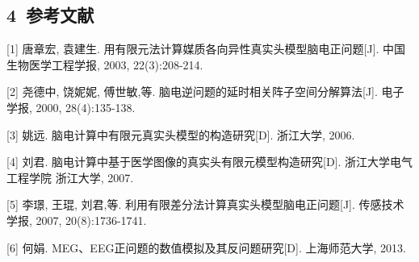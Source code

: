 \subsection{4~参考文献}
\begin{spacing}{1.1}
        \noindent {} \setlength{\hangindent}{2.5em} [1]	唐章宏, 袁建生. 用有限元法计算媒质各向异性真实头模型脑电正问题[J]. 中国生物医学工程学报, 2003, 22(3):208-214.
        
        \noindent {} \setlength{\hangindent}{2.5em} [2]	尧德中, 饶妮妮, 傅世敏,等. 脑电逆问题的延时相关阵子空间分解算法[J]. 电子学报, 2000, 28(4):135-138.

        \noindent {} \setlength{\hangindent}{2.5em}  [3]	姚远. 脑电计算中有限元真实头模型的构造研究[D]. 浙江大学, 2006.

        \noindent {} \setlength{\hangindent}{2.5em} [4]	刘君. 脑电计算中基于医学图像的真实头有限元模型构造研究[D]. 浙江大学电气工程学院 浙江大学, 2007.

        \noindent {} \setlength{\hangindent}{2.5em} [5]	李璟, 王琨, 刘君,等. 利用有限差分法计算真实头模型脑电正问题[J]. 传感技术学报, 2007, 20(8):1736-1741.

        \noindent {} \setlength{\hangindent}{2.5em}  [6]	何娟. MEG、EEG正问题的数值模拟及其反问题研究[D]. 上海师范大学, 2013.
\end{spacing}

\newpage
